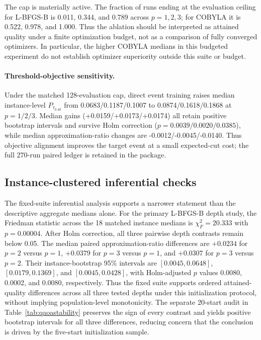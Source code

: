 \documentclass[5p,times]{elsarticle}
\begin{document}
The cap is materially active. The fraction of runs ending at the evaluation ceiling for L-BFGS-B is 0.011, 0.344, and 0.789 across $p=1,2,3$; for COBYLA it is 0.522, 0.978, and 1.000. Thus the ablation should be interpreted as attained quality under a finite optimization budget, not as a comparison of fully converged optimizers. In particular, the higher COBYLA medians in this budgeted experiment do not establish optimizer superiority outside this suite or budget.

\begin{table}[t]
\centering
\caption{Paired ideal-statevector QAOA optimizer robustness under a common cap of 128 exact expectation-objective evaluations per run. ``Budget-exhaust.'' is the fraction of runs that end at the cap without an earlier successful optimizer termination.}
\label{tab:qaoaoptbudget}

\end{table}


\paragraph{Threshold-objective sensitivity.} Under the matched 128-evaluation cap, direct event training raises median instance-level $P_{\tau_{0.40}}$ from 0.0683/0.1187/0.1007 to 0.0874/0.1618/0.1868 at $p=1/2/3$. Median gains (+0.0159/+0.0173/+0.0174) all retain positive bootstrap intervals and survive Holm correction ($p=0.0039/0.0020/0.0385$), while median approximation-ratio changes are -0.0012/-0.0045/-0.0140. Thus objective alignment improves the target event at a small expected-cut cost; the full 270-run paired ledger is retained in the package.

\subsection{Instance-clustered inferential checks}
The fixed-suite inferential analysis supports a narrower statement than the descriptive aggregate medians alone. For the primary L-BFGS-B depth study, the Friedman statistic across the 18 matched instance medians is $\chi_F^2=20.333$ with $p=0.00004$. After Holm correction, all three pairwise depth contrasts remain below 0.05. The median paired approximation-ratio differences are $+0.0234$ for $p=2$ versus $p=1$, $+0.0379$ for $p=3$ versus $p=1$, and $+0.0307$ for $p=3$ versus $p=2$. Their instance-bootstrap 95\% intervals are $[0.0045,0.0648]$, $[0.0179,0.1369]$, and $[0.0045,0.0428]$, with Holm-adjusted $p$ values 0.0080, 0.0002, and 0.0080, respectively. Thus the fixed suite supports ordered attained-quality differences across all three tested depths under this initialization protocol, without implying population-level monotonicity. The separate 20-start audit in Table~\ref{tab:qaoastability} preserves the sign of every contrast and yields positive bootstrap intervals for all three differences, reducing concern that the conclusion is driven by the five-start initialization sample.
\end{document}

